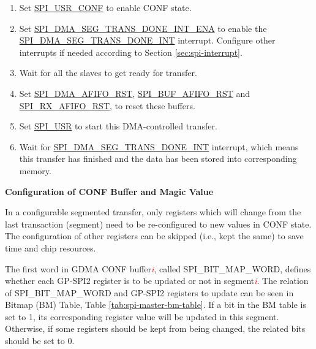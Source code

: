 \documentclass[main\_\_EN.tex]{subfiles}
\begin{document}
\begin{enumerate}
   \item Set \hyperref[fielddesc:SPIUSRCONF]{SPI\_USR\_CONF} to enable CONF state.
   \item Set \hyperref[fielddesc:SPIDMASEGTRANSDONEINTENA]{SPI\_DMA\_SEG\_TRANS\_DONE\_INT\_ENA} to enable the \hyperref[int:SPIDMASEGTRANSDONEINT]{SPI\_DMA\_SEG\_TRANS\_DONE\_INT} interrupt. Configure other interrupts if needed according to Section \ref{sec:spi-interrupt}.

   \item Wait for all the slaves to get ready for transfer.

    \item Set \hyperref[fielddesc:SPIDMAAFIFORST]{SPI\_DMA\_AFIFO\_RST}, \hyperref[fielddesc:SPIBUFAFIFORST]{SPI\_BUF\_AFIFO\_RST} and \hyperref[fielddesc:SPIRXAFIFORST]{SPI\_RX\_AFIFO\_RST}, to reset these buffers.

   \item Set \hyperref[fielddesc:SPIUSR]{SPI\_USR} to start this DMA-controlled transfer.

   \item Wait for \hyperref[int:SPIDMASEGTRANSDONEINT]{SPI\_DMA\_SEG\_TRANS\_DONE\_INT} interrupt, which means this transfer has finished and the data has been stored into corresponding memory.
 \end{enumerate}

\textbf{Configuration of CONF Buffer and Magic Value}\label{sec:spi-sct-conf-buffer-magic-value}

In a configurable segmented transfer, only registers which will change from the last transaction (segment) need to be re-configured to new values in CONF state. The configuration of other registers can be skipped (i.e., kept the same) to save time and chip resources.

The first word in GDMA CONF buffer\textcolor{red}{\it i}, called SPI\_BIT\_MAP\_WORD, defines whether each GP-SPI2 register is to be updated or not in segment\textcolor{red}{\it i}. The relation of SPI\_BIT\_MAP\_WORD and GP-SPI2 registers to update can be seen in Bitmap (BM) Table, Table \ref{tab:spi-master-bm-table}. If a bit in the BM table is set to 1, its corresponding register value will be updated in this segment. Otherwise, if some registers should be kept from being changed, the related bits should be set to 0.
\end{document}
